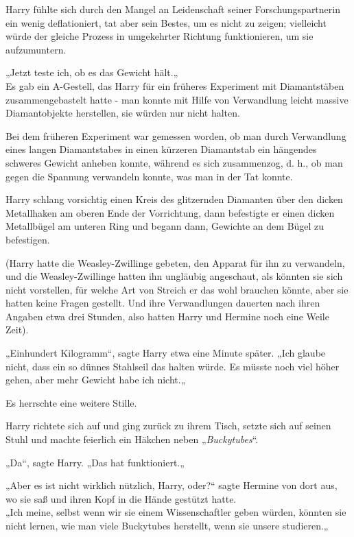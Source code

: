 {Harry fühlte sich durch den Mangel an Leidenschaft seiner Forschungspartnerin ein wenig deflationiert, tat aber sein Bestes, um es nicht zu zeigen; vielleicht würde der gleiche Prozess in umgekehrter Richtung funktionieren, um sie aufzumuntern.

„Jetzt teste ich, ob es das Gewicht hält.„\\ Es gab ein A-Gestell, das Harry für ein früheres Experiment mit Diamantstäben zusammengebastelt hatte - man konnte mit Hilfe von Verwandlung leicht massive Diamantobjekte herstellen, sie würden nur nicht halten.

Bei dem früheren Experiment war gemessen worden, ob man durch Verwandlung eines langen Diamantstabes in einen kürzeren Diamantstab ein hängendes schweres Gewicht anheben konnte, während es sich zusammenzog, d. h., ob man gegen die Spannung verwandeln konnte, was man in der Tat konnte.

Harry schlang vorsichtig einen Kreis des glitzernden Diamanten über den dicken Metallhaken am oberen Ende der Vorrichtung, dann befestigte er einen dicken Metallbügel am unteren Ring und begann dann, Gewichte an dem Bügel zu befestigen.

(Harry hatte die Weasley-Zwillinge gebeten, den Apparat für ihn zu verwandeln, und die Weasley-Zwillinge hatten ihn ungläubig angeschaut, als könnten sie sich nicht vorstellen, für welche Art von Streich er das wohl brauchen könnte, aber sie hatten keine Fragen gestellt. Und ihre Verwandlungen dauerten nach ihren Angaben etwa drei Stunden, also hatten Harry und Hermine noch eine Weile Zeit).

„Einhundert Kilogramm“, sagte Harry etwa eine Minute später. „Ich glaube nicht, dass ein so dünnes Stahlseil das halten würde. Es müsste noch viel höher gehen, aber mehr Gewicht habe ich nicht.„

Es herrschte eine weitere Stille.

Harry richtete sich auf und ging zurück zu ihrem Tisch, setzte sich auf seinen Stuhl und machte feierlich ein Häkchen neben „\emph{Buckytubes}“.

„Da“, sagte Harry. „Das hat funktioniert.„

„Aber es ist nicht wirklich nützlich, Harry, oder?“ sagte Hermine von dort aus, wo sie saß und ihren Kopf in die Hände gestützt hatte.\\ „Ich meine, selbst wenn wir sie einem Wissenschaftler geben würden, könnten sie nicht lernen, wie man viele Buckytubes herstellt, wenn sie unsere studieren.„

}
